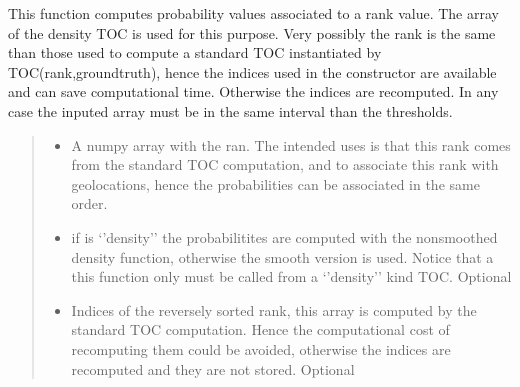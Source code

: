 \documentclass[letterpaper,10pt,english]{sphinxmanual}
\begin{document}
\begin{fulllineitems}
\label{\detokenize{usage:ootoc.TOC.rank2prob}}
\pysigstartsignatures
{}
\pysigstopsignatures
\sphinxAtStartPar
This function computes probability values associated to a rank value. The  array of the density TOC is used for this purpose.
Very possibly the rank is the same than those used to compute a standard TOC instantiated by TOC(rank,groundtruth), hence the indices used
in the constructor are available and can save computational time. Otherwise the indices are recomputed. In any case the inputed 
array must be in the same interval than the thresholds.
\begin{quote}\begin{description}
\begin{itemize}
\item {} 
\sphinxAtStartPar
{} \textendash{} A numpy array with the ran. The intended uses is that this rank comes from the standard TOC computation, and to associate this rank with geolocations, hence the probabilities can be associated in the same order.

\item {} 
\sphinxAtStartPar
{} \textendash{} if  is ‘’density’’ the probabilitites are computed with the non\sphinxhyphen{}smoothed density function, otherwise the smooth version is used. Notice that a this function only must be called from a ‘’density’’ kind TOC. Optional

\item {} 
\sphinxAtStartPar
{} \textendash{} Indices of the reversely sorted rank, this array is computed by the standard TOC computation. Hence the computational cost of recomputing them could be avoided, otherwise the indices are recomputed and they are not stored. Optional

\end{itemize}

\end{description}\end{quote}


\end{fulllineitems}
\end{document}

